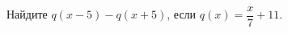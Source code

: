 \begin{ex}
	\begin{condition}
		Найдите \( q(x-5)-q(x+5) \), если \( q(x)=\dfrac{x}{7}+11 \).
	\end{condition}
\end{ex}